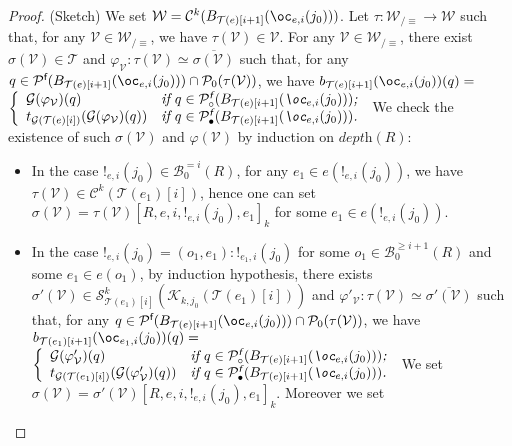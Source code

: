 \documentclass{article}
\newcommand{\target}[1]{t_{#1}}
\theoremstyle{plain}
\newcommand{\nontrivialconnected}[3]{\mathcal{S}_{#1}^{#3}(#2)}
\newcommand{\connectedcomponents}[2]{\mathcal{C}^{#2}(#1)}
\newcommand{\taylor}[2]{\mathcal{T}(#1)[#2]}
\newcommand{\criticalports}[3]{\mathcal{K}_{#2, #3}(#1)}
\newcommand{\groundof}[1]{\mathcal{G}(#1)}
\newcommand{\depthof}[1]{\textit{depth}(#1)}
\newcommand{\cod}{\oc}
\newcommand{\portsatzero}[1]{\mathcal{P}_0(#1)}
\newcommand{\conclusions}[1]{\mathcal{P}^{\textsf{f}}(#1)}
\newcommand{\conclusionscirc}[1]{\mathcal{P}_\circ^{\textsf{f}}(#1)}
\newcommand{\conclusionsnotcirc}[1]{\mathcal{P}_\bullet^{\textsf{f}}(#1)}
\newcommand{\exactboxesatzero}[2]{\mathcal{B}_{0}^{=#2}(#1)}
\newcommand{\boxesatzerogeq}[2]{\mathcal{B}_0^{\geq #2}(#1)}
\begin{document}
\begin{proof}(Sketch) 
We set $\mathcal{W} = \connectedcomponents{B_{\taylor{e}{i+1}}(\cod_{e, i}(j_0))}{k}$. Let $\tau : \mathcal{W}_{/\equiv} \to \mathcal{W}$ such that, for any $\mathcal{V} \in \mathcal{W}_{/\equiv}$, we have $\tau(\mathcal{V}) \in \mathcal{V}$. 
For any $\mathcal{V} \in \mathcal{W}_{/\equiv}$, there exist $\sigma(\mathcal{V}) \in \mathcal{T}$ and $\varphi_\mathcal{V} : \tau(\mathcal{V}) \simeq \overline{\sigma(\mathcal{V})}$ such that, for any $q \in \conclusions{B_{\taylor{e}{i+1}}(\cod_{e, i}(j_0))} \cap \portsatzero{\tau(\mathcal{V})}$, we have $b_{\taylor{e}{i+1}}(\cod_{e, i}(j_0))(q) =$  $\left\lbrace \begin{array}{ll} 
\groundof{\varphi_\mathcal{V}}(q) & \textit{if $q \in \conclusionscirc{B_{\taylor{e}{i+1}}(\cod_{e, i}(j_0))}$;}\\
\target{\groundof{\taylor{e}{i}}}(\groundof{\varphi_\mathcal{V}}(q)) & \textit{if $q \in \conclusionsnotcirc{B_{\taylor{e}{i+1}}(\cod_{e, i}(j_0))}$.} \end{array} \right.$ We check the existence of such $\sigma(\mathcal{V})$ and $\varphi(\mathcal{V})$ by induction on $\depthof{R}$:
\begin{itemize}
\item In the case $!_{e, i}(j_0) \in \exactboxesatzero{R}{i}$, for any $e_1 \in e(!_{e, i}(j_0))$, we have $\tau(\mathcal{V}) \in \connectedcomponents{\taylor{e_1}{i}}{k}$, hence one can set $\sigma(\mathcal{V}) = \tau(\mathcal{V})[R, e, i, !_{e, i}(j_0), e_1]_k$ for some $e_1 \in e(!_{e, i}(j_0))$.
\item In the case $!_{e, i}(j_0) = (o_1, e_1):!_{e_1, i}(j_0)$ for some $o_1 \in \boxesatzerogeq{R}{i+1}$ and some $e_1 \in e(o_1)$, by induction hypothesis, there exists $\sigma'(\mathcal{V}) \in \nontrivialconnected{\taylor{e_1}{i}}{\criticalports{\taylor{e_1}{i}}{k}{j_0}}{k}$ and $\varphi'_\mathcal{V} : \tau(\mathcal{V}) \simeq \overline{\sigma'(\mathcal{V})}$ such that, for any $q \in \conclusions{B_{\taylor{e}{i+1}}(\cod_{e, i}(j_0))} \cap \portsatzero{\tau(\mathcal{V})}$, we have $b_{\taylor{e_1}{i+1}}(\cod_{e_1, i}(j_0))(q) =$  $\left\lbrace \begin{array}{ll} 
\groundof{\varphi'_\mathcal{V}}(q) & \textit{if $q \in \conclusionscirc{B_{\taylor{e}{i+1}}(\cod_{e, i}(j_0))}$;}\\
\target{\groundof{\taylor{e_1}{i}}}(\groundof{\varphi'_\mathcal{V}}(q)) & \textit{if $q \in \conclusionsnotcirc{B_{\taylor{e}{i+1}}(\cod_{e, i}(j_0))}$.} \end{array} \right.$ We set $\sigma(\mathcal{V}) = \sigma'(\mathcal{V})[R, e, i, !_{e, i}(j_0), e_1]_k$. Moreover we set 

\end{itemize}
\end{proof}
\end{document}
